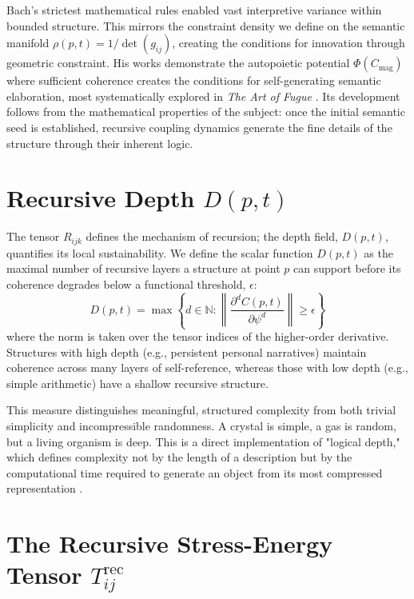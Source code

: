 Bach's strictest mathematical rules enabled vast interpretive variance within bounded structure. This mirrors the constraint density we define on the semantic manifold \(\rho(p,t) = 1/\det(g_{ij})\), creating the conditions for innovation through geometric constraint. His works demonstrate the autopoietic potential \(\Phi(C_{\text{mag}})\) where sufficient coherence creates the conditions for self-generating semantic elaboration, most systematically explored in \textit{The Art of Fugue} \autocite{Bach1751}. Its development follows from the mathematical properties of the subject: once the initial semantic seed is established, recursive coupling dynamics generate the fine details of the structure through their inherent logic.

\section{\texorpdfstring{Recursive Depth $D(p, t)$}{Recursive Depth D(p, t)}}

The tensor \(R_{ijk}\) defines the mechanism of recursion; the depth field, \(D(p, t)\), quantifies its local sustainability. We define the scalar function \(D(p,t)\) as the maximal number of recursive layers a structure at point \(p\) can support before its coherence degrades below a functional threshold, \(\epsilon\):
\begin{equation}
D(p, t) = \max \left\{ d \in \mathbb{N} : \left\| \frac{\partial^d C(p,t)}{\partial \psi^d} \right\| \geq \epsilon \right\}
\end{equation}
where the norm is taken over the tensor indices of the higher-order derivative. Structures with high depth (e.g., persistent personal narratives) maintain coherence across many layers of self-reference, whereas those with low depth (e.g., simple arithmetic) have a shallow recursive structure.

This measure distinguishes meaningful, structured complexity from both trivial simplicity and incompressible randomness. A crystal is simple, a gas is random, but a living organism is deep. This is a direct implementation of "logical depth," which defines complexity not by the length of a description but by the computational time required to generate an object from its most compressed representation \autocite{Bennett1988}.

\section{\texorpdfstring{The Recursive Stress-Energy Tensor $T_{ij}^{\text{rec}}$}{The Recursive Stress-Energy Tensor Tij_rec}}

